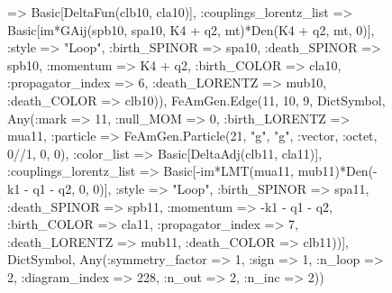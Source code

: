\documentclass{revtex4}
\begin{document}
\begin{figure}[!htb]
\begin{center}
{=> Basic[DeltaFun(clb10, cla10)], :couplings_lorentz_list => Basic[im*GAij(spb10, spa10, K4 + q2, mt)*Den(K4 + q2, mt, 0)], :style => "Loop", :birth_SPINOR => spa10, :death_SPINOR => spb10, :momentum => K4 + q2, :birth_COLOR => cla10, :propagator_index => 6, :death_LORENTZ => mub10, :death_COLOR => clb10)), FeAmGen.Edge(11, 10, 9, Dict{Symbol, Any}(:mark => 11, :null_MOM => 0, :birth_LORENTZ => mua11, :particle => FeAmGen.Particle(21, "g", "g", :vector, :octet, 0//1, 0, 0), :color_list => Basic[DeltaAdj(clb11, cla11)], :couplings_lorentz_list => Basic[-im*LMT(mua11, mub11)*Den(-k1 - q1 - q2, 0, 0)], :style => "Loop", :birth_SPINOR => spa11, :death_SPINOR => spb11, :momentum => -k1 - q1 - q2, :birth_COLOR => cla11, :propagator_index => 7, :death_LORENTZ => mub11, :death_COLOR => clb11))], Dict{Symbol, Any}(:symmetry_factor => 1, :sign => 1, :n_loop => 2, :diagram_index => 228, :n_out => 2, :n_inc => 2)) 
}
\end{center}
\end{figure}
\end{document}
